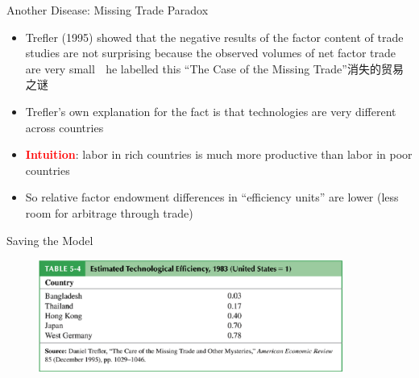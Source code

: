 \documentclass[10pt,hyperref={CJKbookmarks=true},xcolor=dvipsnames,aspectratio=169]{beamer}
\begin{document}
\begin{frame}{Another Disease: Missing Trade Paradox }

\begin{itemize}
\item Trefler (1995) showed that the negative results of the factor content
of trade studies are not surprising because the observed volumes of
net factor trade are very small  he labelled this “The Case of the
Missing Trade”消失的贸易之谜
\item Trefler’s own explanation for the fact is that technologies are very
different across countries 
\item \textbf{\textcolor{red}{Intuition}}: labor in rich countries is much
more productive than labor in poor countries 
\item So relative factor endowment differences in “efficiency units” are
lower (less room for arbitrage through trade)
\end{itemize}
\end{frame}

\begin{frame}{Saving the Model }


\begin{figure}


\begin{centering}
\includegraphics[width=10cm]{fig/ho/lec5-18}
\par\end{centering}

\end{figure}

\end{frame}
\end{document}
